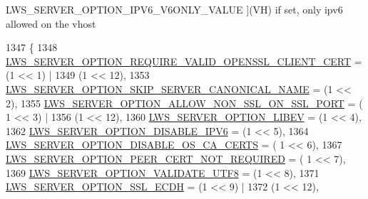 \begin{Desc}
\begin{description}
{L\+W\+S\+\_\+\+S\+E\+R\+V\+E\+R\+\_\+\+O\+P\+T\+I\+O\+N\+\_\+\+I\+P\+V6\+\_\+\+V6\+O\+N\+L\+Y\+\_\+\+V\+A\+L\+UE\hypertarget{group__context-and-vhost_gga41c2d763f78cc248df3b9f8645dbd2a5aca5d42820b65eac5618ec3f0bd8a1160}{}\label{group__context-and-vhost_gga41c2d763f78cc248df3b9f8645dbd2a5aca5d42820b65eac5618ec3f0bd8a1160}
}](VH) if set, only ipv6 allowed on the vhost \end{description}
\end{Desc}

\begin{DoxyCode}
1347                          \{
1348         \hyperlink{group__context-and-vhost_gga41c2d763f78cc248df3b9f8645dbd2a5a274ed462a1a9239eb6ddf9007f5b7092}{LWS\_SERVER\_OPTION\_REQUIRE\_VALID\_OPENSSL\_CLIENT\_CERT}  
      = (1 << 1) |
1349                                                                   (1 << 12),
1353         \hyperlink{group__context-and-vhost_gga41c2d763f78cc248df3b9f8645dbd2a5a6582c985ee0ceaadc1d277030eae2d7c}{LWS\_SERVER\_OPTION\_SKIP\_SERVER\_CANONICAL\_NAME}                
      = (1 << 2),
1355         \hyperlink{group__context-and-vhost_gga41c2d763f78cc248df3b9f8645dbd2a5a1cc4562d05cba52a6dfa0697a65ade0d}{LWS\_SERVER\_OPTION\_ALLOW\_NON\_SSL\_ON\_SSL\_PORT}          = (
      1 << 3) |
1356                                                                   (1 << 12),
1360         \hyperlink{group__context-and-vhost_gga41c2d763f78cc248df3b9f8645dbd2a5a273d9975675130de0c6dc937dde7c8a6}{LWS\_SERVER\_OPTION\_LIBEV}                                  = (1 << 4),
1362         \hyperlink{group__context-and-vhost_gga41c2d763f78cc248df3b9f8645dbd2a5a34ab36e68c0d593b6f19b8d5ef1240a9}{LWS\_SERVER\_OPTION\_DISABLE\_IPV6}                            = (1 << 5),
1364         \hyperlink{group__context-and-vhost_gga41c2d763f78cc248df3b9f8645dbd2a5a4933347a821e73c3f1e13fb6bfc7ad93}{LWS\_SERVER\_OPTION\_DISABLE\_OS\_CA\_CERTS}                      = (
      1 << 6),
1367         \hyperlink{group__context-and-vhost_gga41c2d763f78cc248df3b9f8645dbd2a5ac56a8a6590e74a8016d0fae09fb404fc}{LWS\_SERVER\_OPTION\_PEER\_CERT\_NOT\_REQUIRED}                = (
      1 << 7),
1369         \hyperlink{group__context-and-vhost_gga41c2d763f78cc248df3b9f8645dbd2a5aa0158b4e85420811e6b0f1378c6ded0f}{LWS\_SERVER\_OPTION\_VALIDATE\_UTF8}                          = (1 << 8),
1371         \hyperlink{group__context-and-vhost_gga41c2d763f78cc248df3b9f8645dbd2a5a1b2f8bde0f62adc7ebe81b2043f34c0c}{LWS\_SERVER\_OPTION\_SSL\_ECDH}                            = (1 << 9) |
1372                                                                   (1 << 12),

\end{DoxyCode}
